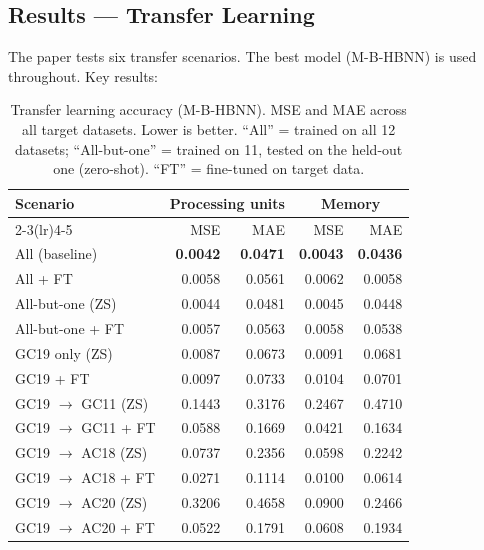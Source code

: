 \documentclass[12pt,a4paper]{article}
\begin{document}
\subsection{Results --- Transfer Learning}

The paper tests six transfer scenarios. The best model (M-B-HBNN) is used
throughout. Key results:

\begin{table}[H]
\centering
\small
\caption{Transfer learning accuracy (M-B-HBNN). MSE and MAE across all
         target datasets. Lower is better. ``All'' = trained on all 12
         datasets; ``All-but-one'' = trained on 11, tested on the held-out
         one (zero-shot). ``FT'' = fine-tuned on target data.}
\begin{tabular}{@{}lrrrr@{}}
\toprule
\textbf{Scenario} &
  \multicolumn{2}{c}{\textbf{Processing units}} &
  \multicolumn{2}{c}{\textbf{Memory}} \\
\cmidrule(lr){2-3}\cmidrule(lr){4-5}
& MSE & MAE & MSE & MAE \\
\midrule
All (baseline)       & \textbf{0.0042} & \textbf{0.0471} & \textbf{0.0043} & \textbf{0.0436} \\
All + FT             & 0.0058 & 0.0561 & 0.0062 & 0.0058 \\
All-but-one (ZS)     & 0.0044 & 0.0481 & 0.0045 & 0.0448 \\
All-but-one + FT     & 0.0057 & 0.0563 & 0.0058 & 0.0538 \\
\midrule
GC19 only (ZS)       & 0.0087 & 0.0673 & 0.0091 & 0.0681 \\
GC19 + FT            & 0.0097 & 0.0733 & 0.0104 & 0.0701 \\
\midrule
GC19 $\to$ GC11 (ZS) & 0.1443 & 0.3176 & 0.2467 & 0.4710 \\
GC19 $\to$ GC11 + FT & 0.0588 & 0.1669 & 0.0421 & 0.1634 \\
GC19 $\to$ AC18 (ZS) & 0.0737 & 0.2356 & 0.0598 & 0.2242 \\
GC19 $\to$ AC18 + FT & 0.0271 & 0.1114 & 0.0100 & 0.0614 \\
GC19 $\to$ AC20 (ZS) & 0.3206 & 0.4658 & 0.0900 & 0.2466 \\
GC19 $\to$ AC20 + FT & 0.0522 & 0.1791 & 0.0608 & 0.1934 \\
\bottomrule
\end{tabular}
\end{table}
\end{document}
